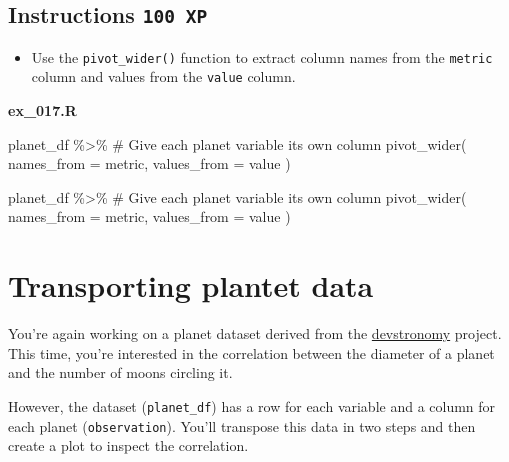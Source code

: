 \documentclass[
  letterpaper,
  DIV=11,
  numbers=noendperiod]{scrreprt}
\newenvironment{Shaded}{\begin{snugshade}}{\end{snugshade}}
\newcommand{\AttributeTok}[1]{\textcolor[rgb]{0.40,0.45,0.13}{#1}}
\newcommand{\CommentTok}[1]{\textcolor[rgb]{0.37,0.37,0.37}{#1}}
\newcommand{\FunctionTok}[1]{\textcolor[rgb]{0.28,0.35,0.67}{#1}}
\newcommand{\NormalTok}[1]{\textcolor[rgb]{0.00,0.23,0.31}{#1}}
\newcommand{\SpecialCharTok}[1]{\textcolor[rgb]{0.37,0.37,0.37}{#1}}
\providecommand{\tightlist}{%
  \setlength{\itemsep}{0pt}\setlength{\parskip}{0pt}}\usepackage{longtable,booktabs,array}
\begin{document}
\hypertarget{instructions-100-xp-14}{%
\subsection*{\texorpdfstring{Instructions
\texttt{100\ XP}}{Instructions 100 XP}}\label{instructions-100-xp-14}}

\begin{itemize}
\tightlist
\item
  Use the \texttt{pivot\_wider()} function to extract column names from
  the \texttt{metric} column and values from the \texttt{value} column.
\end{itemize}

\textbf{ex\_017.R}

\begin{Shaded}
\begin{Highlighting}[]

\NormalTok{planet\_df }\SpecialCharTok{\%\textgreater{}\%} 
  \CommentTok{\# Give each planet variable its own column}
  \FunctionTok{pivot\_wider}\NormalTok{(}
    \AttributeTok{names\_from =}\NormalTok{ metric,}
    \AttributeTok{values\_from =}\NormalTok{ value}
\NormalTok{  )}

\NormalTok{  planet\_df }\SpecialCharTok{\%\textgreater{}\%} 
  \CommentTok{\# Give each planet variable its own column}
  \FunctionTok{pivot\_wider}\NormalTok{(}
    \AttributeTok{names\_from =}\NormalTok{ metric,}
    \AttributeTok{values\_from =}\NormalTok{ value}
\NormalTok{  )}
\end{Highlighting}
\end{Shaded}

\hypertarget{transporting-plantet-data}{%
\section{Transporting plantet data}\label{transporting-plantet-data}}

You're again working on a planet dataset derived from the
\href{https://devstronomy.com/\#/datasets}{devstronomy} project. This
time, you're interested in the correlation between the diameter of a
planet and the number of moons circling it.

However, the dataset (\texttt{planet\_df}) has a row for each variable
and a column for each planet (\texttt{observation}). You'll transpose
this data in two steps and then create a plot to inspect the
correlation.
\end{document}
